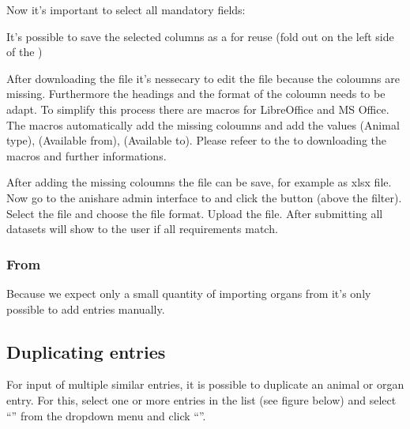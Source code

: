 \documentclass[letterpaper,10pt,openany,oneside,english]{sphinxmanual}
\begin{document}
Now it’s important to select all mandatory fields:

\noindent{}

It’s possible to save the selected columns as a  for reuse (fold out  on the left side of the )

After downloading the file it’s nessecary to edit the file because the coloumns  are missing.
Furthermore the headings and the format of the coloumn  needs to be adapt.
To simplify this process there are macros for LibreOffice and MS Office. The macros automatically add the missing coloumns and add the values
 (Animal type),  (Available from),  (Available to).
Please refeer to the  to downloading the macros and further informations.

After adding the missing coloumns the file can be save, for example as xlsx file. Now go to the anishare admin interface to 
and click the button  (above the filter). Select the file and choose the file format. Upload the file. After submitting all datasets will show to
the user if all requirements match.


\subsubsection{From }
\label{\detokenize{index:id4}}
Because we expect only a small quantity of importing organs from  it’s only possible to add entries manually.


\subsection{Duplicating entries}
\label{\detokenize{index:duplicating-entries}}
For input of multiple similar entries, it is possible to duplicate an animal or organ entry. For this, select one
or more entries in the list (see figure below) and select “” from the dropdown menu and click
“”.
\end{document}

